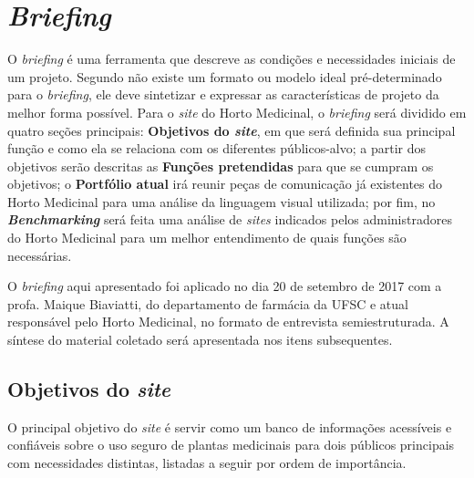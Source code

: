 \section{\texorpdfstring{\emph{Briefing}}{Briefing}}\label{briefing}

O \emph{briefing} é uma ferramenta que descreve as condições e necessidades iniciais de um projeto. Segundo \textcite[22]{pazmino10} não existe um formato ou modelo ideal pré-determinado para o \emph{briefing}, ele deve sintetizar e expressar as características de projeto da melhor forma possível. Para o \emph{site} do Horto Medicinal, o \emph{briefing} será dividido em quatro seções principais: \textbf{Objetivos do \emph{site}}, em que será definida sua principal função e como ela se relaciona com os diferentes públicos-alvo; a partir dos objetivos serão descritas as \textbf{Funções pretendidas} para que se cumpram os objetivos; o \textbf{Portfólio atual} irá reunir peças de comunicação já existentes do Horto Medicinal para uma análise da linguagem visual utilizada; por fim, no \textbf{\emph{Benchmarking}} será feita uma análise de \emph{sites} indicados pelos administradores do Horto Medicinal para um melhor entendimento de quais funções são necessárias.

O \emph{briefing} aqui apresentado foi aplicado no dia 20 de setembro de 2017 com a profa. Maique Biaviatti, do departamento de farmácia da UFSC e atual responsável pelo Horto Medicinal, no formato de entrevista semiestruturada. A síntese do material coletado será apresentada nos itens subsequentes.

\subsection{\texorpdfstring{Objetivos do \emph{site}}{Objetivos do site}}\label{objetivos-do-site}

O principal objetivo do \emph{site} é servir como um banco de informações acessíveis e confiáveis sobre o uso seguro de plantas medicinais para dois públicos principais com necessidades distintas, listadas a seguir por ordem de importância.

